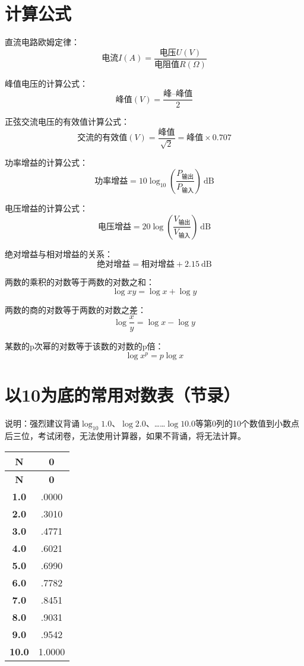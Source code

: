 \newpage

\section{计算公式}

直流电路欧姆定律：
$$\mbox{电流}I(A)=\frac{\mbox{电压}U(V)}{\mbox{电阻值}R(\Omega)}$$

峰值电压的计算公式：
$$\mbox{峰值}(V)=\frac{\mbox{峰--峰值}}{2}$$

正弦交流电压的有效值计算公式：
$$\mbox{交流的有效值}(V)=\frac{\mbox{峰值}}{\sqrt{2}}=\mbox{峰值}\times0.707$$

功率增益的计算公式：
$$\mbox{功率增益}=10 \log_{10} \left( {\frac{P_{ \mbox{输出} }}{P_{ \mbox{输入} }}}\right)\ \mathrm{dB}$$

电压增益的计算公式：
$$\mbox{电压增益}=20 \log \left( {\frac{V_{ \mbox{输出} }}{V_{ \mbox{输入} }}} \right)\ \mathrm{dB}$$


绝对增益与相对增益的关系：
$$\mbox{绝对增益} = \mbox{相对增益} + 2.15 \ \mathrm{dB}$$

两数的乘积的对数等于两数的对数之和：
$$\log xy=\log x+\log y$$

两数的商的对数等于两数的对数之差：
$$\log\frac{x}{y}=\log x-\log y$$

某数的p次幂的对数等于该数的对数的p倍：
$$\log x^p =p\log x$$

\newpage


\section{以10为底的常用对数表（节录）}

说明：强烈建议背诵$\log_{10} 1.0$、$\log 2.0$、……$\log 10.0$等第0列的10个数值到小数点后三位，考试闭卷，无法使用计算器，如果不背诵，将无法计算。

\begin{longtable}[c]{|c|c|}
\hline
\textbf{N} & \textbf{0} \\
\hline
\endfirsthead
\hline
\textbf{N} & \textbf{0} \\
\endhead
\textbf{1.0} & .0000 \\ \hline
\textbf{2.0} & .3010 \\ \hline
\textbf{3.0} & .4771 \\ \hline
\textbf{4.0} & .6021 \\ \hline
\textbf{5.0} & .6990 \\ \hline
\textbf{6.0} & .7782 \\ \hline
\textbf{7.0} & .8451 \\ \hline
\textbf{8.0} & .9031 \\ \hline
\textbf{9.0} & .9542 \\ \hline
\textbf{10.0} & 1.0000 \\ \hline
\end{longtable}


